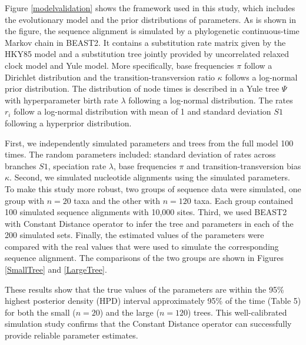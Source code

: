 \documentclass{bmcart}
\begin{document}
Figure \ref{modelvalidation} shows the framework used in this study, which includes the evolutionary model and the prior distributions of parameters. As is shown in the figure, the sequence alignment is simulated by a phylogenetic continuous-time Markov chain in BEAST2. It contains a substitution rate matrix given by the HKY85 \cite{hasegawa1985dating} model and a substitution tree jointly provided by uncorrelated relaxed clock model and Yule model. More specifically, base frequencies $\pi$ follow a Dirichlet distribution and the transition-transversion ratio $\kappa$ follows a log-normal prior distribution. The distribution of node times is described in a Yule tree $\Psi$ with hyperparameter birth rate $\lambda $ following a log-normal distribution. The rates $r_i$ follow a log-normal distribution with mean of 1 and standard deviation $S1$ following a hyperprior distribution.

First, we independently simulated parameters and trees from the full model 100 times. The random parameters included: standard deviation of rates across branches $S1$, speciation rate $\lambda $, base frequencies $\pi$ and transition-transversion bias $\kappa$. Second, we simulated nucleotide alignments using the simulated parameters. To make this study more robust, two groups of sequence data were simulated, one group with $n=20$ taxa and the other with $n=120$ taxa. Each group contained 100 simulated sequence alignments with 10,000 sites. Third, we used BEAST2 with Constant Distance operator to infer the tree and parameters in each of the 200 simulated sets. Finally, the estimated values of the parameters were compared with the real values that were used to simulate the corresponding sequence alignment. The comparisons of the two groups are shown in Figures \ref{SmallTree} and \ref{LargeTree}.

These results show that the true values of the parameters are within the 95\% highest posterior density (HPD) interval approximately 95\% of the time (Table 5) for both the small ($n=20$) and the large ($n=120$) trees. This well-calibrated simulation study confirms that the Constant Distance operator can successfully provide reliable parameter estimates.

\end{document}

